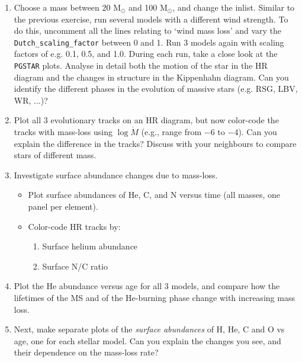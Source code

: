 \documentclass[11pt,a4paper]{article}
\begin{document}
\begin{enumerate}[label=(\alph*)]
\item Choose a mass between 20 M$_\odot$ and 100 M$_\odot$, and change the inlist. Similar to the previous exercise, run several models with a different wind strength. To do this, uncomment all the lines relating to `wind mass loss' and vary the \verb|Dutch_scaling_factor| between 0 and 1. Run 3 models again with scaling factors of e.g. 0.1, 0.5, and 1.0. During each run, take a close look at the \texttt{PGSTAR} plots. Analyse in detail both the motion of the star in the HR diagram and the changes in structure in the Kippenhahn diagram. Can you identify the different phases in the evolution of massive stars (e.g. RSG, LBV, WR, ...)? %

\item Plot all 3 evolutionary tracks on an HR diagram, but now color-code the tracks with mass-loss using $\log \dot{M}$ (e.g., range from $-6$ to $-4$).
Can you explain the difference in the tracks? 
Discuss with your neighbours to compare stars of different mass.

\item Investigate surface abundance changes due to mass-loss. 
\begin{itemize}
    \item Plot surface abundances of He, C, and N versus time (all masses, one panel per element).
    \item Color-code HR tracks by:
    \begin{enumerate}
        \item Surface helium abundance
        \item Surface N/C ratio
    \end{enumerate}

\end{itemize}

\item Plot the He abundance versus age for all 3 models, and compare how the lifetimes of the MS and of the He-burning phase change with increasing mass loss.

\item Next, make separate plots of the \emph{surface abundances} of H, He, C and O vs age, one for each stellar model. Can you explain the changes you see, and their dependence on the mass-loss rate?



\end{enumerate}
\end{document}
